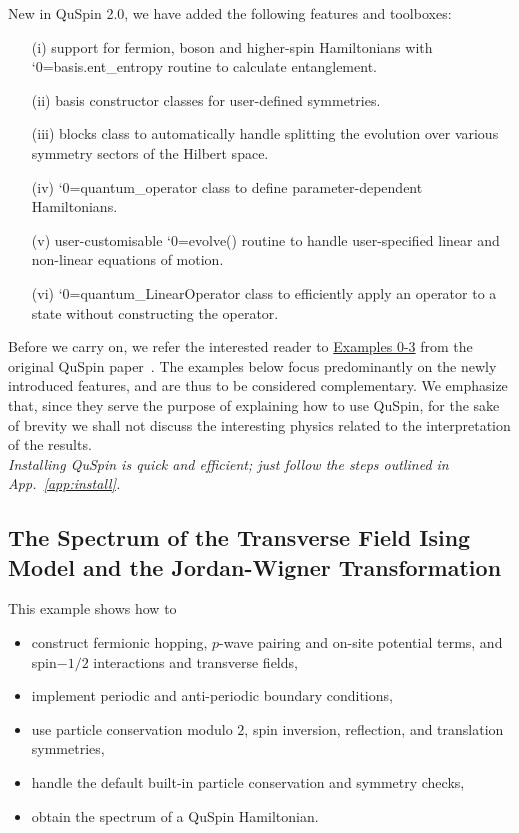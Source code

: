 \documentclass{SciPost}
\newcommand\0{\scalebox{-1}[1]{0}}
\let\svttfamily\ttfamily
\renewcommand\ttfamily{\svttfamily\catcode`0=\active }
\renewcommand\texttt{\bgroup\ttfamily\texttthelp}
\def\texttthelp#1{#1\egroup}
\begin{document}
New in QuSpin 2.0, we have added the following features and toolboxes:
\begin{itemize}
	\item[(i)] support for fermion, boson and higher-spin Hamiltonians with \texttt{basis.ent\_entropy} routine to calculate entanglement.
	\item[(ii)] basis constructor classes for user-defined symmetries.
	\item[(iii)] blocks class to automatically handle splitting the evolution over various symmetry sectors of the Hilbert space.
	\item[(iv)] \texttt{quantum\_operator} class to define parameter-dependent Hamiltonians.
	\item[(v)] user-customisable \texttt{evolve()} routine to handle user-specified linear and non-linear equations of motion.
	\item[(vi)] \texttt{quantum\_LinearOperator} class to efficiently apply an operator to a state without constructing the operator.
\end{itemize}

\noindent Before we carry on, we refer the interested reader to \href{http://weinbe58.github.io/QuSpin/Examples.html}{Examples 0-3} from the original QuSpin paper~\cite{weinberg_17_quspin}. The examples below focus predominantly on the newly introduced features, and are thus to be considered complementary. We emphasize that, since they serve the purpose of explaining how to use QuSpin, for the sake of brevity we shall not discuss the interesting physics related to the interpretation of the results.\\

\emph{Installing QuSpin is quick and efficient; just follow the steps outlined in App.~\ref{app:install}.}


\subsection{The Spectrum of the Transverse Field Ising Model and the Jordan-Wigner Transformation}
\label{subsec:JW}

This example shows how to
\begin{itemize}
	\item construct fermionic hopping, $p$-wave pairing and on-site potential terms, and spin$-1/2$ interactions and transverse fields,
	\item implement periodic and anti-periodic boundary conditions,
	\item use particle conservation modulo $2$, spin inversion, reflection, and translation symmetries,
	\item handle the default built-in particle conservation and symmetry checks,
	\item obtain the spectrum of a QuSpin Hamiltonian.
\end{itemize}
\end{document}
